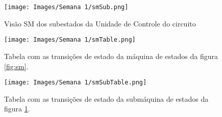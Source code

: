 \documentclass[amsmath,amssymb,floatfix]{report}
\begin{document}
\begin{figure}[H]
\centering
\texttt{[image: Images/Semana 1/smSub.png]} 
    \caption{Visão SM dos subestados da Unidade de Controle do circuito}
    \label{fig:smSub}
\end{figure} 

\begin{figure}[H]
\centering
\texttt{[image: Images/Semana 1/smTable.png]} 
    \caption{Tabela com as transições de estado da máquina de estados da figura \ref{fig:sm}.}
    \label{fig:smTable}
\end{figure} 

\begin{figure}[H]
\centering
\texttt{[image: Images/Semana 1/smSubTable.png]} 
    \caption{Tabela com as transições de estado da submáquina de estados da figura \ref{fig:smSub}.}
    \label{fig:smSubTable}
\end{figure} 
\end{document}
